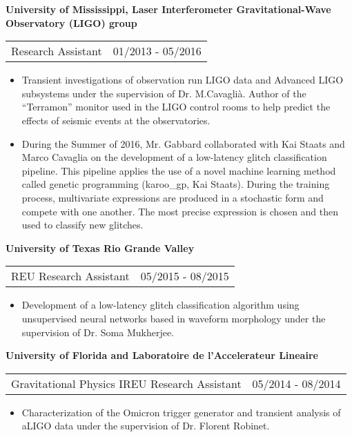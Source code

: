 {\bf{University of Mississippi, Laser Interferometer Gravitational-Wave Observatory (LIGO) group
}}\\
\begin{tabular}{@{}p{4in}p{2in}}
Research Assistant & 01/2013 - 05/2016\\
\end{tabular}
\begin{itemize}
\setlength\itemsep{0em}
\item Transient investigations of observation run LIGO data and Advanced LIGO subsystems under the supervision of Dr. M.Cavagli\`{a}. Author of the ``Terramon'' monitor used in the LIGO control rooms to help predict the effects of seismic events at the observatories.
\item During the Summer of 2016, Mr. Gabbard collaborated with Kai Staats and Marco Cavaglia on the development of a low-latency glitch classification pipeline. This pipeline applies the use of a novel machine learning method called genetic programming (karoo\_gp, Kai Staats). During the training process, multivariate expressions are produced in a stochastic form and compete with one another. The most precise expression is chosen and then used to classify new glitches.
\end{itemize}

{\bf{University of Texas Rio Grande Valley}}\\
\begin{tabular}{@{}p{4in}p{2in}}
REU Research Assistant & 05/2015 - 08/2015\\
\end{tabular}
\begin{itemize}
\setlength\itemsep{0em}
\item Development of a low-latency glitch classification algorithm using unsupervised neural networks based in waveform morphology under the supervision of Dr. Soma Mukherjee.
\end{itemize}

{\bf{University of Florida and Laboratoire de l'Accelerateur Lineaire}}\\
\begin{tabular}{@{}p{4in}p{2in}}
Gravitational Physics IREU Research Assistant & 05/2014 - 08/2014\\
\end{tabular}
\begin{itemize}
\setlength\itemsep{0em}
\item Characterization of the Omicron trigger generator and transient analysis of aLIGO data under the supervision of Dr. Florent Robinet.
\\
\end{itemize}

\endinput